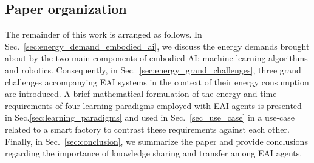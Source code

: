 \subsection{Paper organization}
The remainder of this work is arranged as follows. In Sec.~\ref{sec:energy_demand_embodied_ai}, we discuss the energy demands brought about by the two main components of embodied AI: machine learning algorithms and robotics. Consequently, in Sec.~\ref{sec:energy_grand_challenges}, three grand challenges accompanying EAI systems in the context of their energy consumption are introduced. A brief mathematical formulation of the energy and time requirements of four learning paradigms employed with EAI agents is presented in Sec.\ref{sec:learning_paradigms} and used in Sec.~\ref{sec_use_case} in a use-case related to a smart factory to contrast these requirements against each other. Finally, in Sec.~\ref{sec:conclusion}, we summarize the paper and provide conclusions regarding the importance of knowledge sharing and transfer among EAI agents. 